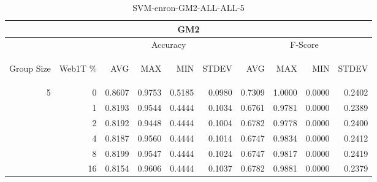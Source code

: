 \begin{center}
\begin{table}[htbp] 
 \begin{center}
\begin{tabular}{ | r | r | r | r | r | r | r | r | r | r |}
\hline
\multicolumn{10}{|c|}{GM2}\\
\hline
 & & \multicolumn{4}{|c|}{Accuracy} & \multicolumn{4}{|c|}{F-Score}\\ \cline{3-10}
\begin{sideways}Group Size\end{sideways} & \begin{sideways}Web1T \%\end{sideways} & \begin{sideways}AVG\end{sideways} & \begin{sideways}MAX\end{sideways} & \begin{sideways}MIN\end{sideways} & \begin{sideways}STDEV\end{sideways} & \begin{sideways}AVG\end{sideways} & \begin{sideways}MAX\end{sideways} & \begin{sideways}MIN\end{sideways} & \begin{sideways}STDEV\end{sideways}\\
\hline
\multirow{5}{*}{5}
 & 0 & 0.8607 & 0.9753 & 0.5185 & 0.0980 & 0.7309 & 1.0000 & 0.0000 & 0.2402\\ \cline{2-10}
 & 1 & 0.8193 & 0.9544 & 0.4444 & 0.1034 & 0.6761 & 0.9781 & 0.0000 & 0.2389\\ \cline{2-10}
 & 2 & 0.8192 & 0.9448 & 0.4444 & 0.1004 & 0.6782 & 0.9778 & 0.0000 & 0.2400\\ \cline{2-10}
 & 4 & 0.8187 & 0.9560 & 0.4444 & 0.1014 & 0.6747 & 0.9834 & 0.0000 & 0.2412\\ \cline{2-10}
 & 8 & 0.8199 & 0.9547 & 0.4444 & 0.1024 & 0.6747 & 0.9817 & 0.0000 & 0.2419\\ \cline{2-10}
 & 16 & 0.8154 & 0.9606 & 0.4444 & 0.1037 & 0.6782 & 0.9881 & 0.0000 & 0.2379\\ \cline{2-10}
\hline
\end{tabular}
\caption{SVM-enron-GM2-ALL-ALL-5}
\label{table:SVM-enron-GM2-ALL-ALL-5}
\end{center}
 \end{table}
\end{center}


